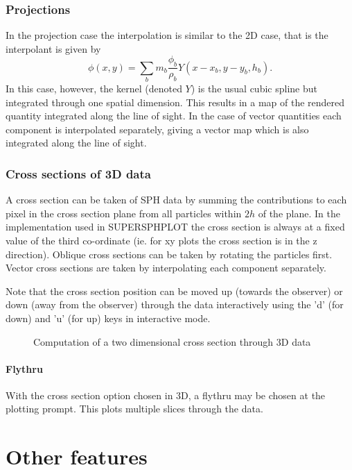 \documentclass[a4paper,11pt]{article}
\begin{document}
\subsubsection{Projections} 
 In the projection case the interpolation is similar to the 2D case, that is the interpolant is
given by
\begin{equation}
\phi(x,y) = \sum_b m_b \frac{\phi_b}{\rho_b} Y(x - x_b, y-y_b, h_b).
\end{equation}
In this case, however, the kernel (denoted $Y$) is the usual cubic spline but integrated through one spatial
dimension. This results in a map of the rendered quantity integrated along the line of sight.
In the case of vector quantities each component is interpolated separately, giving a vector
map which is also integrated along the line of
sight.

\subsubsection{Cross sections of 3D data}
 A cross section can be taken of SPH data by summing the
contributions to each pixel in the cross section plane from all particles within
$2h$ of the plane. In
the implementation used in SUPERSPHPLOT the cross section is always at a fixed value of the third co-ordinate
(ie. for xy plots the cross section is in the z direction). Oblique cross
sections can be taken by rotating the particles first. Vector cross sections are taken by
interpolating each component separately.

 Note that the cross section position can be moved up (towards the observer) or down (away from the
 observer) through the data interactively using
the 'd' (for down) and 'u' (for up) keys in interactive mode.

\begin{figure}
\begin{center}
\caption{Computation of a two dimensional cross section through 3D data}
\label{fig:xsec3D}
\end{center}
\end{figure}

\paragraph{Flythru}
 With the cross section option chosen in 3D, a flythru may be chosen at the plotting prompt. This
plots multiple slices through the data.

\section{Other features}
\end{document}
